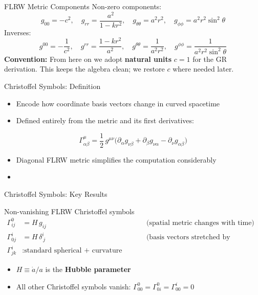\documentclass[aspectratio=169,11pt]{beamer}
\begin{document}
\begin{frame}{FLRW Metric Components}
Non-zero components:
\begin{equation*}
    g_{00}=-c^2,\quad g_{rr}=\frac{a^2}{1-kr^2},\quad
    g_{\theta\theta}=a^2r^2,\quad g_{\phi\phi}=a^2r^2\sin^2\!\theta
\end{equation*}
Inverses:
\begin{equation*}
    g^{00}=-\frac{1}{c^2},\quad g^{rr}=\frac{1-kr^2}{a^2},\quad
    g^{\theta\theta}=\frac{1}{a^2r^2},\quad g^{\phi\phi}=\frac{1}{a^2r^2\sin^2\!\theta}
\end{equation*}
\vfill
\footnotesize\textbf{Convention:} From here on we adopt \textbf{natural units} $c=1$ for the GR derivation. This keeps the algebra clean; we restore $c$ where needed later.
\end{frame}

\begin{frame}{Christoffel Symbols: Definition}
\begin{itemize}
    \item Encode how coordinate basis vectors change in curved spacetime
    \item Defined entirely from the metric and its first derivatives:
\end{itemize}
\begin{equation*}
    \Gamma^\mu_{\alpha\beta}
    = \frac{1}{2}\,g^{\mu\nu}\bigl(
    \partial_\alpha g_{\nu\beta}
    + \partial_\beta g_{\nu\alpha}
    - \partial_\nu g_{\alpha\beta}\bigr)
\end{equation*}
\begin{itemize}
    \item Diagonal FLRW metric simplifies the computation considerably
    \item {}
\end{itemize}
\end{frame}

\begin{frame}{Christoffel Symbols: Key Results}
\begin{block}{Non-vanishing FLRW Christoffel symbols}
\begin{align*}
    \Gamma^0_{ij} &= H\,g_{ij}
        &&\text{(spatial metric changes with time)}\\[6pt]
    \Gamma^i_{0j} &= H\,\delta^i_{\ j}
        &&\text{(basis vectors stretched by expansion)}\\[6pt]
    \Gamma^i_{jk} &: \text{standard spherical + curvature terms}
\end{align*}
\end{block}
\begin{itemize}
    \item $H\equiv\dot{a}/a$ is the \textbf{Hubble parameter}
    \item All other Christoffel symbols vanish: $\Gamma^0_{00}=\Gamma^0_{0i}=\Gamma^i_{00}=0$
\end{itemize}
\end{frame}
\end{document}
